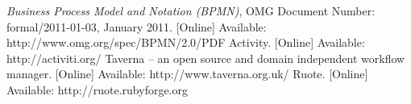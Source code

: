 \renewcommand{\bibname}{References}
\begin{thebibliography}{99}
 \textit{Business Process Model and Notation 
(BPMN)}, OMG Document Number: formal/2011-01-03, January 2011. [Online] Available: http://www.omg.org/spec/BPMN/2.0/PDF
 Activity. [Online] Available: http://activiti.org/
 Taverna -- an open source and domain independent workflow manager. [Online] Available: http://www.taverna.org.uk/
 Ruote. [Online] Available: http://ruote.rubyforge.org

\end{thebibliography}

%    
%    
